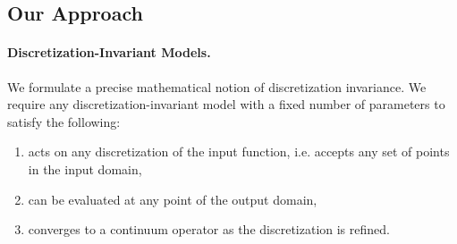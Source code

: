 



\subsection{Our Approach}
\label{ssec:OC}



\paragraph{Discretization-Invariant Models.}

We formulate a precise mathematical notion of discretization invariance. We require any discretization-invariant model with a fixed number of parameters to satisfy the following:
\begin{enumerate}[leftmargin=*]
    \item  acts on any discretization of the input function, i.e. accepts any set of points in the input domain,
    \item can be evaluated at any point of the output domain,
    \item  converges to a continuum operator as the discretization is refined. 
\end{enumerate} 



